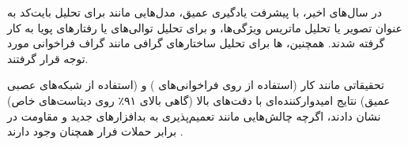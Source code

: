 در سال‌های اخیر، با پیشرفت یادگیری عمیق، مدل‌هایی مانند  برای تحلیل بایت‌کد به عنوان تصویر یا تحلیل ماتریس ویژگی‌ها، و  برای تحلیل توالی‌های  یا رفتارهای پویا به کار گرفته شدند. همچنین، ها برای تحلیل ساختارهای گرافی مانند گراف فراخوانی مورد توجه قرار گرفتند.

تحقیقاتی مانند کار \textcite{ZhangNix2017} (استفاده از  روی فراخوانی‌های ) و \textcite{Vinayakumar2019} (استفاده از شبکه‌های عصبی عمیق) نتایج امیدوارکننده‌ای با دقت‌های بالا (گاهی بالای ۹۱٪ روی دیتاست‌های خاص) نشان دادند، اگرچه چالش‌هایی مانند تعمیم‌پذیری به بدافزارهای جدید و مقاومت در برابر حملات فرار همچنان وجود دارند \cite{Demontis2017}.

























